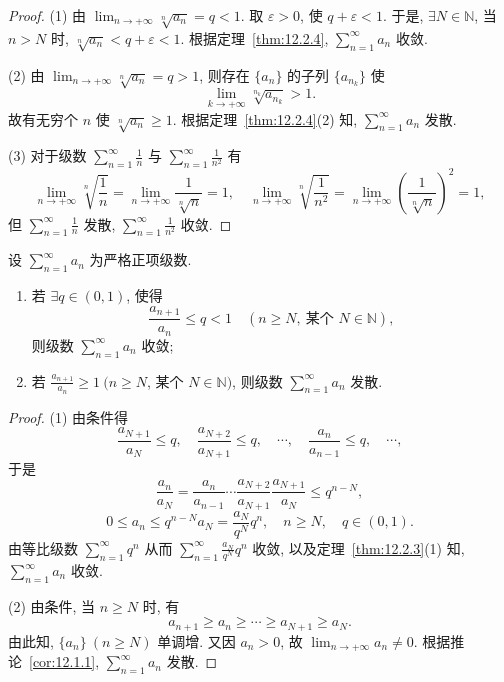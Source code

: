 \begin{proof}
(1) 由 $\lim_{n\to+\infty}\sqrt[n]{a_{n}}=q<1$. 取 $\varepsilon>0$, 使 $q+\varepsilon<1$. 于是, $\exists N\in\mathbb{N}$, 当 $n>N$ 时, $\sqrt[n]{a_{n}}<q+\varepsilon<1$. 根据定理~\ref{thm:12.2.4}, $\sum_{n=1}^{\infty}a_{n}$ 收敛.

(2) 由 $\lim_{n\to+\infty}\sqrt[n]{a_{n}}=q>1$, 则存在 $\{a_{n}\}$ 的子列 $\{a_{n_{k}}\}$ 使
\[
  \lim_{k\to+\infty}\sqrt[n_{k}]{a_{n_{k}}}>1.
\]
故有无穷个 $n$ 使 $\sqrt[n]{a_{n}}\geqslant1$. 根据定理~\ref{thm:12.2.4}(2) 知, $\sum_{n=1}^{\infty}a_{n}$ 发散.

(3) 对于级数 $\sum_{n=1}^{\infty}\frac{1}{n}$ 与 $\sum_{n=1}^{\infty}\frac{1}{n^{2}}$ 有
\[
  \lim_{n\to+\infty}\sqrt[n]{\frac{1}{n}}=\lim_{n\to+\infty}\frac{1}{\sqrt[n]{n}}=1,
  \quad\lim_{n\to+\infty}\sqrt[n]{\frac{1}{n^{2}}}
  =\lim_{n\to+\infty}\left(\frac{1}{\sqrt[n]{n}}\right)^{2}=1,
\]
但 $\sum_{n=1}^{\infty}\frac{1}{n}$ 发散, $\sum_{n=1}^{\infty}\frac{1}{n^{2}}$ 收敛.
\end{proof}

\begin{theorem}\label{thm:12.2.5}
设 $\sum_{n=1}^{\infty}a_{n}$ 为严格正项级数.
\begin{enumerate}
  \item 若 $\exists q\in(0,1)$, 使得
  \[
    \frac{a_{n+1}}{a_{n}}\leqslant q<1\quad(n\geqslant N,\ \text{某个 }N\in\mathbb{N}),
\]
  则级数 $\sum_{n=1}^{\infty}a_{n}$ 收敛;
  \item 若 $\frac{a_{n+1}}{a_{n}}\geqslant1\ (n\geqslant N$, 某个 $N\in\mathbb{N})$, 则级数 $\sum_{n=1}^{\infty}a_{n}$ 发散.
\end{enumerate}
\end{theorem}

\begin{proof}
(1) 由条件得
\[
  \frac{a_{N+1}}{a_{N}}\leqslant q,\quad\frac{a_{N+2}}{a_{N+1}}\leqslant q,\quad\cdots,\quad\frac{a_{n}}{a_{n-1}}\leqslant q,\quad\cdots,
\]
于是
\[
  \frac{a_{n}}{a_{N}}=\frac{a_{n}}{a_{n-1}}\cdots\frac{a_{N+2}}{a_{N+1}}\frac{a_{N+1}}{a_{N}}\leqslant q^{n-N},
\]
\[
  0\leqslant a_{n}\leqslant q^{n-N}a_{N}=\frac{a_{N}}{q^{N}}q^{n},\quad n\geqslant N,\quad q\in(0,1).
\]
由等比级数 $\sum_{n=1}^{\infty}q^{n}$ 从而 $\sum_{n=1}^{\infty}\frac{a_{N}}{q^{N}}q^{n}$ 收敛, 以及定理~\ref{thm:12.2.3}(1) 知, $\sum_{n=1}^{\infty}a_{n}$ 收敛.

(2) 由条件, 当 $n\geqslant N$ 时, 有
\[
  a_{n+1}\geqslant a_{n}\geqslant\cdots\geqslant a_{N+1}\geqslant a_{N}.
\]
由此知, $\{a_{n}\}\ (n\geqslant N)$ 单调增. 又因 $a_{n}>0$, 故 $\lim_{n\to+\infty}a_{n}\neq0$. 根据推论~\ref{cor:12.1.1}, $\sum_{n=1}^{\infty}a_{n}$ 发散.
\end{proof}

